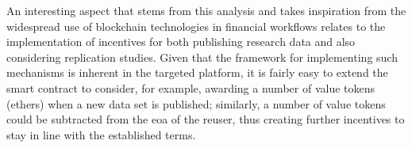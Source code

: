 An interesting aspect that stems from this analysis and takes inspiration from the widespread use of blockchain technologies in financial workflows relates to the implementation of incentives for both publishing research data and also considering replication studies. Given that the framework for implementing such mechanisms is inherent in the targeted platform, it is fairly easy to extend the smart contract to consider, for example, awarding a number of value tokens (ethers) when a new data set is published; similarly, a number of value tokens could be subtracted from the \gls{eoa} of the reuser, thus creating further incentives to stay in line with the established terms.